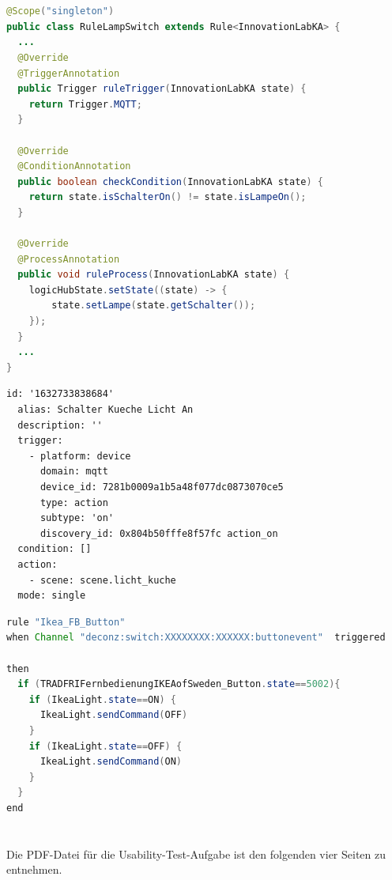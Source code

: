 \documentclass[
  ngerman           %
  ,twoside          %
  ,11pt
  ,pdftex
]{report}
\begin{document}
\chapter{}
\label{appendix:steuerzentrale}
\begin{lstlisting}[language=Java, frame=lines, xleftmargin=\parindent, style=algoBericht, label={code:switch}, captionpos=b, caption={Regeldefinition der Lichtschaltung}]
@Scope("singleton")
public class RuleLampSwitch extends Rule<InnovationLabKA> {
  ...
  @Override
  @TriggerAnnotation
  public Trigger ruleTrigger(InnovationLabKA state) {
    return Trigger.MQTT;
  }
  
  @Override
  @ConditionAnnotation
  public boolean checkCondition(InnovationLabKA state) {
    return state.isSchalterOn() != state.isLampeOn();
  }
  
  @Override
  @ProcessAnnotation
  public void ruleProcess(InnovationLabKA state) {
    logicHubState.setState((state) -> {
        state.setLampe(state.getSchalter());
    });
  }
  ...
}
\end{lstlisting}
\pagebreak
\label{appendix:hoasAutomation}
\begin{lstlisting}[language=xml, frame=lines, xleftmargin=\parindent, style=algoBericht, label={code:hoasAutomation}, captionpos=b, caption={Regeldefinition der Lichtschaltung über Home Assistant}]
  id: '1632733838684'
  alias: Schalter Kueche Licht An
  description: ''
  trigger:
    - platform: device
      domain: mqtt
      device_id: 7281b0009a1b5a48f077dc0873070ce5
      type: action
      subtype: 'on'
      discovery_id: 0x804b50fffe8f57fc action_on
  condition: []
  action:
    - scene: scene.licht_kuche
  mode: single
\end{lstlisting}

\label{appendix:openhabCode}
\begin{lstlisting}[language=Java, frame=lines, xleftmargin=\parindent, style=algoBericht, label={code:openhabSwitch}, captionpos=b, caption={Regeldefinition der Lichtschaltung via openHAB}]
rule "Ikea_FB_Button" 
when Channel "deconz:switch:XXXXXXXX:XXXXXX:buttonevent"  triggered
         
then
  if (TRADFRIFernbedienungIKEAofSweden_Button.state==5002){
    if (IkeaLight.state==ON) {
      IkeaLight.sendCommand(OFF)
    }
    if (IkeaLight.state==OFF) {
      IkeaLight.sendCommand(ON)
    }
  }
end
\end{lstlisting}

\chapter{}
\label{appendix:usabilitytestpaper}
Die PDF-Datei für die Usability-Test-Aufgabe ist den folgenden vier Seiten zu entnehmen. 




\end{document}
